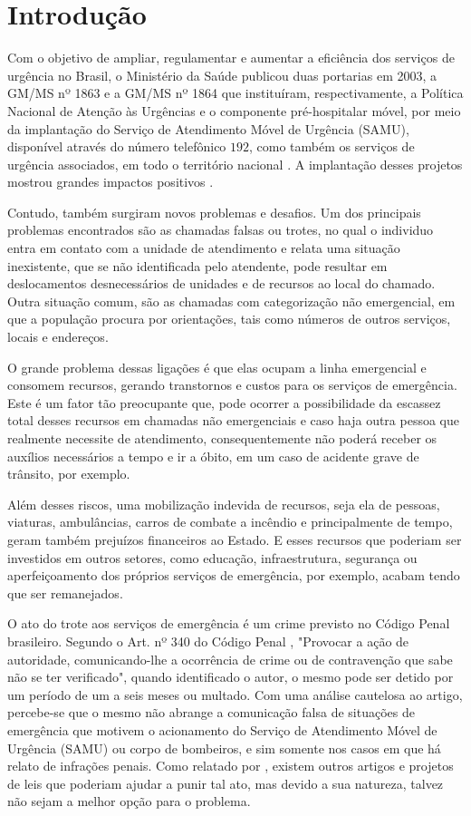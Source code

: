 \chapter{Introdução}
Com o objetivo de ampliar, regulamentar e aumentar a eficiência dos serviços de urgência no Brasil, o Ministério da Saúde publicou duas portarias em 2003, a GM/MS nº 1863 e a GM/MS nº 1864 que instituíram, respectivamente, a Política Nacional de Atenção às Urgências e o componente pré-hospitalar móvel, por meio da implantação do Serviço de Atendimento Móvel de Urgência (SAMU), disponível através do número telefônico $192$, como também os serviços de urgência associados, em todo o território nacional \citep{p1863, p1864}. A implantação desses projetos mostrou grandes impactos positivos \citep{VIEIRA2008, MACHADO2011, MINAYO2008}. 

Contudo, também surgiram novos problemas e desafios. Um dos principais problemas encontrados são as chamadas falsas ou trotes, no qual o individuo entra em contato com a unidade de atendimento e relata uma situação inexistente, que se não identificada pelo atendente, pode resultar em deslocamentos desnecessários de unidades e de recursos ao local do chamado. Outra situação comum, são as chamadas com categorização não emergencial, em que a população procura por orientações, tais como números de outros serviços, locais e endereços. 

O grande problema dessas ligações é que elas ocupam a linha emergencial e consomem recursos, gerando transtornos e custos para os serviços de emergência. Este é um fator tão preocupante que, pode ocorrer a possibilidade da escassez total desses recursos em chamadas não emergenciais e caso haja outra pessoa que realmente necessite de
atendimento, consequentemente não poderá receber os auxílios necessários a tempo e ir a óbito, em um caso de acidente grave de trânsito, por exemplo.

Além desses riscos, uma mobilização indevida de recursos, seja ela de pessoas, viaturas, ambulâncias, carros de combate a incêndio e principalmente de tempo, geram também prejuízos financeiros ao Estado. E esses recursos que poderiam ser investidos em outros setores, como educação, infraestrutura, segurança ou aperfeiçoamento dos próprios serviços de emergência, por exemplo, acabam tendo que ser remanejados.

O ato do trote aos serviços de emergência é um crime previsto no Código Penal brasileiro. Segundo o Art. nº 340 do Código Penal \citep{cp340}, "Provocar a ação de autoridade, comunicando-lhe a ocorrência de crime ou de contravenção que sabe não se ter verificado", quando identificado o autor, o mesmo pode ser detido por um período de um a seis meses ou multado. Com uma análise cautelosa ao artigo, percebe-se que o mesmo não abrange a comunicação falsa de situações de emergência que motivem o acionamento do Serviço de Atendimento Móvel de Urgência (SAMU) ou corpo de bombeiros, e sim somente nos casos em que há relato de infrações penais. Como relatado por \cite{peixoto2015combate}, existem outros artigos e projetos de leis que poderiam ajudar a punir tal ato, mas devido a sua natureza, talvez não sejam a melhor opção para o problema. 

